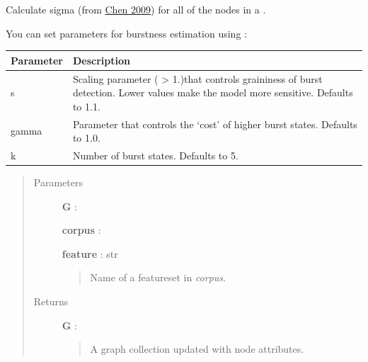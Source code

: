 \documentclass[letterpaper,10pt,english]{sphinxmanual}
\begin{document}
\begin{fulllineitems}
\label{tethne.analyze.corpus:tethne.analyze.corpus.sigma}
Calculate sigma (from \href{http://arxiv.org/pdf/0904.1439.pdf}{Chen 2009}) for
all of the nodes in a {\hyperref[tethne.classes.graphcollection:tethne.classes.graphcollection.GraphCollection]{}}.

You can set parameters for burstness estimation using :

\begin{tabulary}{\linewidth}{|L|L|}
\hline
\textsf{\relax 
Parameter
} & \textsf{\relax 
Description
}\\
\hline
s
 & 
Scaling parameter ( \textgreater{} 1.)that controls graininess of burst
detection. Lower values make the model more sensitive. Defaults
to 1.1.
\\

gamma
 & 
Parameter that controls the `cost' of higher burst states.
Defaults to 1.0.
\\

k
 & 
Number of burst states. Defaults to 5.
\\
\hline\end{tabulary}

\begin{quote}\begin{description}
\item[{Parameters}] \leavevmode
\textbf{G} : {\hyperref[tethne.classes.graphcollection:tethne.classes.graphcollection.GraphCollection]{}}

\textbf{corpus} : {\hyperref[tethne.classes.corpus:tethne.classes.corpus.Corpus]{}}

\textbf{feature} : str
\begin{quote}

Name of a featureset in \emph{corpus}.
\end{quote}

\item[{Returns}] \leavevmode
\textbf{G} : {\hyperref[tethne.classes.graphcollection:tethne.classes.graphcollection.GraphCollection]{}}
\begin{quote}

A graph collection updated with  node attributes.
\end{quote}


\end{description}
\end{quote}
\end{fulllineitems}
\end{document}
